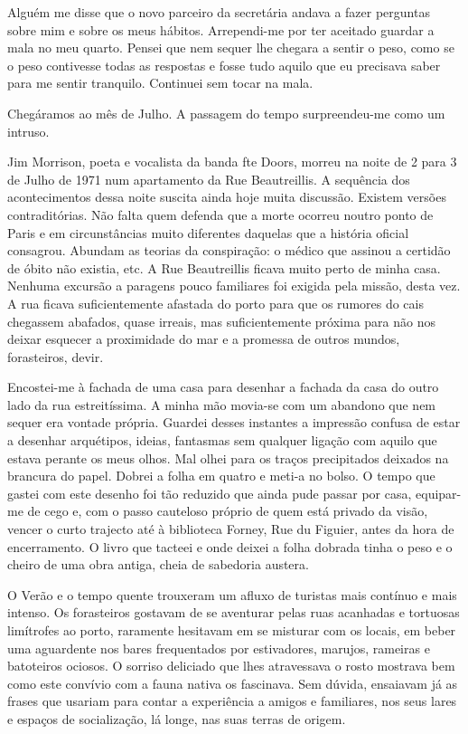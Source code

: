 Alguém me disse que o novo parceiro da secretária andava a fazer
perguntas sobre mim e sobre os meus hábitos. Arrependi-me por ter
aceitado guardar a mala no meu quarto. Pensei que nem sequer lhe chegara
a sentir o peso, como se o peso contivesse todas as respostas e fosse
tudo aquilo que eu precisava saber para me sentir tranquilo. Continuei
sem tocar na mala.

Chegáramos ao mês de Julho. A passagem do tempo surpreendeu-me como um
intruso.

Jim Morrison, poeta e vocalista da banda fte Doors, morreu na noite de
2 para 3 de Julho de 1971 num apartamento da Rue Beautreillis. A
sequência dos acontecimentos dessa noite suscita ainda hoje muita
discussão. Existem versões contraditórias. Não falta quem defenda que
a morte ocorreu noutro ponto de Paris e em circunstâncias muito
diferentes daquelas que a história oficial consagrou. Abundam as teorias
da conspiração: o médico que assinou a certidão de óbito não existia, etc. A Rue Beautreillis ficava muito perto de minha casa. Nenhuma
excursão a paragens pouco familiares foi exigida pela missão, desta vez.
A rua ficava suficientemente afastada do porto para que os rumores do
cais chegassem abafados, quase irreais, mas suficientemente próxima para
não nos deixar esquecer a proximidade do mar e a promessa de outros
mundos, forasteiros, devir.

Encostei-me à fachada de uma casa para desenhar a fachada da casa do
outro lado da rua estreitíssima. A minha mão movia-se com um abandono
que nem sequer era vontade própria. Guardei desses instantes a impressão
confusa de estar a desenhar arquétipos, ideias, fantasmas sem qualquer
ligação com aquilo que estava perante os meus olhos. Mal olhei para os
traços precipitados deixados na brancura do papel. Dobrei a folha em
quatro e meti-a no bolso. O tempo que gastei com este desenho foi tão
reduzido que ainda pude passar por casa, equipar-me de cego e, com o
passo cauteloso próprio de quem está privado da visão, vencer o curto
trajecto até à biblioteca Forney, Rue du Figuier, antes da hora de
encerramento. O livro que tacteei e onde deixei a folha dobrada tinha o
peso e o cheiro de uma obra antiga, cheia de sabedoria austera.



O Verão e o tempo quente trouxeram um afluxo de turistas mais contínuo
e mais intenso. Os forasteiros gostavam de se aventurar pelas ruas
acanhadas e tortuosas limítrofes ao porto, raramente hesitavam em se
misturar com os locais, em beber uma aguardente nos bares frequentados
por estivadores, marujos, rameiras e batoteiros ociosos. O sorriso
deliciado que lhes atravessava o rosto mostrava bem como este convívio
com a fauna nativa os fascinava. Sem dúvida, ensaiavam já as frases que
usariam para contar a experiência a amigos e familiares, nos seus lares
e espaços de socialização, lá longe, nas suas terras de origem.

